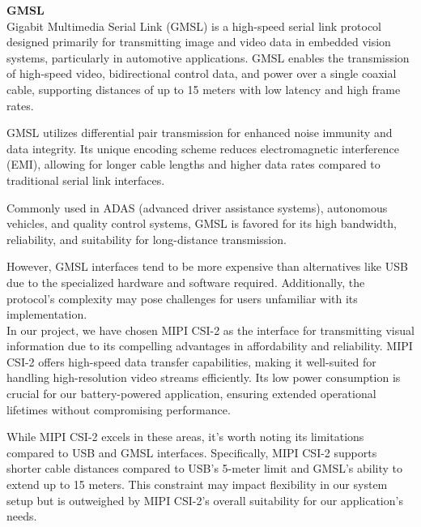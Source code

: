 \textbf{GMSL} \\
Gigabit Multimedia Serial Link (GMSL) is a high-speed serial link protocol designed primarily for transmitting image and video data in embedded vision systems, particularly in automotive applications. GMSL enables the transmission of high-speed video, bidirectional control data, and power over a single coaxial cable, supporting distances of up to 15 meters with low latency and high frame rates.

GMSL utilizes differential pair transmission for enhanced noise immunity and data integrity. Its unique encoding scheme reduces electromagnetic interference (EMI), allowing for longer cable lengths and higher data rates compared to traditional serial link interfaces.

Commonly used in ADAS (advanced driver assistance systems), autonomous vehicles, and quality control systems, GMSL is favored for its high bandwidth, reliability, and suitability for long-distance transmission.

However, GMSL interfaces tend to be more expensive than alternatives like USB due to the specialized hardware and software required. Additionally, the protocol's complexity may pose challenges for users unfamiliar with its implementation.\\

In our project, we have chosen MIPI CSI-2 as the interface for transmitting visual information due to its compelling advantages in affordability and reliability. MIPI CSI-2 offers high-speed data transfer capabilities, making it well-suited for handling high-resolution video streams efficiently. Its low power consumption is crucial for our battery-powered application, ensuring extended operational lifetimes without compromising performance.

While MIPI CSI-2 excels in these areas, it's worth noting its limitations compared to USB and GMSL interfaces. Specifically, MIPI CSI-2 supports shorter cable distances compared to USB's 5-meter limit and GMSL's ability to extend up to 15 meters. This constraint may impact flexibility in our system setup but is outweighed by MIPI CSI-2's overall suitability for our application's needs.

